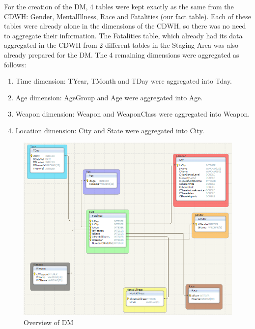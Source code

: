\documentclass[11pt, journal]{IEEEtran}
\begin{document}
For the creation of the DM, 4 tables were kept exactly as the same from the CDWH: Gender, MentalIllness, Race and  Fatalities (our fact table). Each of these tables were already alone in the dimensions of the CDWH, so there was no need to aggregate their information.
The Fatalities table, which already had its data aggregated in the CDWH from 2 different tables in the Staging Area was also already prepared for the DM.  The 4 remaining dimensions were aggregated as follows: 

\begin{enumerate}
	\item Time dimension: TYear, TMonth and TDay were aggregated into Tday. 
	\item Age dimension: AgeGroup and Age were aggregated into Age.
	\item Weapon dimension: Weapon and WeaponClass were aggregated into Weapon.
	\item Location dimension: City and State were aggregated into City.
\end{enumerate}

\begin{figure}[htb]
	\centering
		\includegraphics[width=1.0\columnwidth]{images/snapshot3}
	\caption{Overview of DM}
	\label{fig:probov}
\end{figure}
 
\end{document}
